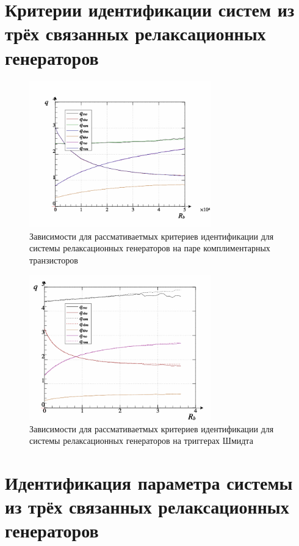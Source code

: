 \section{Критерии идентификации систем из трёх связанных релаксационных генераторов}

\begin{figure}[htb!]
  \centerline{\includegraphics[width=0.7\textwidth]{p/relax3_read_q-p_q1.png} }
  \caption{Зависимости для рассмативаетмых критериев идентификации для системы релаксационных генераторов на паре комплиментарных транзисторов}
  \label{atu:f:relax3d_q}
\end{figure}

\begin{figure}[htb!]
  \centerline{\includegraphics[width=0.7\textwidth]{p/relax3ds_read_q-p_q1.png} }
  \caption{Зависимости для рассмативаетмых критериев идентификации для системы релаксационных генераторов на триггерах Шмидта}
  \label{atu:f:relax3ds_q}
\end{figure}

\section{Идентификация параметра системы из трёх связанных релаксационных генераторов}

